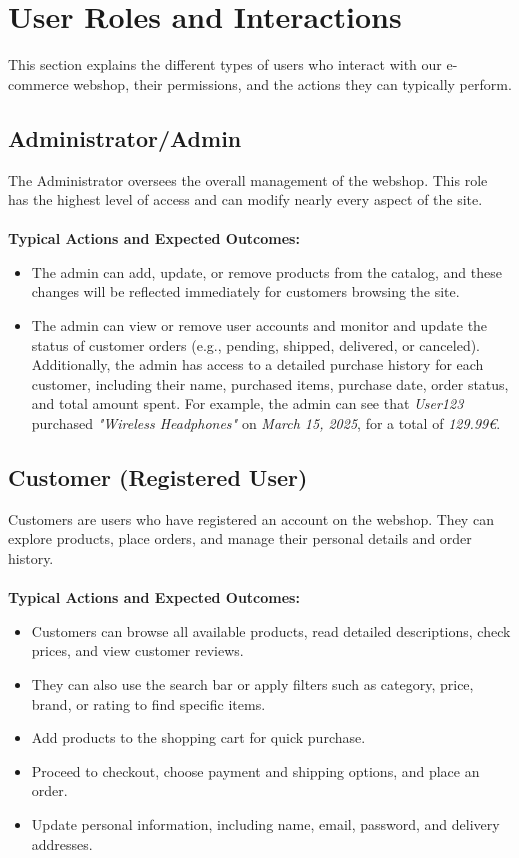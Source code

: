 \documentclass[a4paper,12pt]{article}
\begin{document}
	

	\section{User Roles and Interactions}
	This section explains the different types of users who interact with our e-commerce webshop, their permissions, and the actions they can typically perform.
	\subsection*{Administrator/Admin}
	The Administrator oversees the overall management of the webshop. This role has the highest level of access and can modify nearly every aspect of the site. \\ \\
	\textbf{Typical Actions and Expected Outcomes:}
	\begin{itemize}
		\item The admin can add, update, or remove products from the catalog, and these changes will be reflected immediately for customers browsing the site.
		\item The admin can view or remove user accounts and monitor and update the status of customer orders (e.g., pending, shipped, delivered, or canceled). Additionally, the admin has access to a detailed purchase history for each customer, including their name, purchased items, purchase date, order status, and total amount spent. For example, the admin can see that \textit{User123} purchased  \textit{"Wireless Headphones"} on \textit{March 15, 2025}, for a total of \textit{129.99€}.
	\end{itemize}

	\subsection*{Customer (Registered User)}
Customers are users who have registered an account on the webshop. They can explore products, place orders, and manage their personal details and order history. \\ \\
	\textbf{Typical Actions and Expected Outcomes:}
	\begin{itemize}
  		\item Customers can browse all available products, read detailed descriptions, check prices, and view customer reviews.
    		\item They can also use the search bar or apply filters such as category, price, brand, or rating to find specific items.
    		\item Add products to the shopping cart for quick purchase.
    		\item Proceed to checkout, choose payment and shipping options, and place an order.
    		\item Update personal information, including name, email, password, and delivery addresses.
	\end{itemize}
\end{document}
